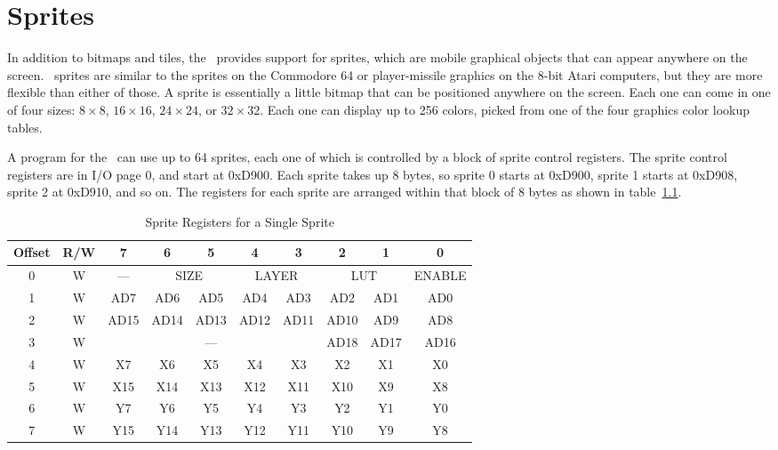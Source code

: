 \chapter{Sprites}

In addition to bitmaps and tiles, the \jr\ provides support for sprites, which are mobile graphical objects that can appear anywhere on the screen. \jr\ sprites are similar to the sprites on the Commodore 64 or player-missile graphics on the 8-bit Atari computers, but they are more flexible than either of those. A sprite is essentially a little bitmap that can be positioned anywhere on the screen. Each one can come in one of four sizes: $8 \times 8$, $16 \times 16$, $24 \times 24$, or $32 \times 32$. Each one can display up to 256 colors, picked from one of the four graphics color lookup tables.

A program for the \jr\ can use up to 64 sprites, each one of which is controlled by a block of sprite control registers. The sprite control registers are in I/O page 0, and start at 0xD900. Each sprite takes up 8 bytes, so sprite 0 starts at 0xD900, sprite 1 starts at 0xD908, sprite 2 at 0xD910, and so on. The registers for each sprite are arranged within that block of 8 bytes as shown in table~\ref{tab:sp_reg}.

\begin{table}[ht]
    \begin{center}
        \begin{tabular}{|c|c|c|c|c|c|c|c|c|c|} \hline
            Offset & R/W & 7 & 6 & 5 & 4 & 3 & 2 & 1 & 0 \\ \hline\hline
            0 & W & --- & \multicolumn{2}{|c|}{SIZE} & \multicolumn{2}{|c|}{LAYER} & \multicolumn{2}{|c|}{LUT} & ENABLE \\ \hline
            1 & W & AD7 & AD6 & AD5 & AD4 & AD3 & AD2 & AD1 & AD0 \\ \hline
            2 & W & AD15 & AD14 & AD13 & AD12 & AD11 & AD10 & AD9 & AD8 \\ \hline
            3 & W & \multicolumn{5}{|c|}{---} & AD18 & AD17 & AD16 \\ \hline
            4 & W & X7 & X6 & X5 & X4 & X3 & X2 & X1 & X0 \\ \hline
            5 & W & X15 & X14 & X13 & X12 & X11 & X10 & X9 & X8 \\ \hline
            6 & W & Y7 & Y6 & Y5 & Y4 & Y3 & Y2 & Y1 & Y0 \\ \hline
            7 & W & Y15 & Y14 & Y13 & Y12 & Y11 & Y10 & Y9 & Y8 \\ \hline
        \end{tabular}
    \end{center}
    \caption{Sprite Registers for a Single Sprite}
    \label{tab:sp_reg}
\end{table}

